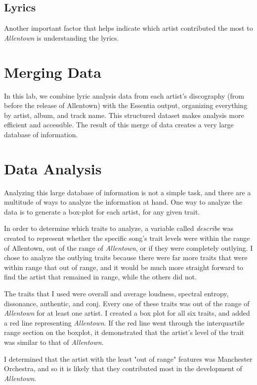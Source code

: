 \documentclass{article}\usepackage[]{graphicx}\usepackage[]{xcolor}
\begin{document}
\begin{multicols}{2}
\subsection{Lyrics}
Another important factor that helps indicate which artist contributed the most to  \emph{Allentown} is understanding the lyrics.

\section{Merging Data}
In this lab, we combine lyric analysis data from each artist’s discography (from before the release of Allentown) with the Essentia output, organizing everything by artist, album, and track name. This structured dataset makes analysis more efficient and accessible. The result of this merge of data creates a very large database of information.

\section{Data Analysis}
Analyzing this large database of information is not a simple task, and there are a multitude of ways to analyze the information at hand. One way to analyze the data is to generate a box-plot for each artist, for any given trait.

In order to determine which traits to analyze, a variable called \emph{describe} was created to represent whether the specific song's trait levels were within the range of Allentown, out of the range of \emph{Allentown}, or if they were completely outlying. I chose to analyze the outlying traits because there were far more traits that were within range that out of range, and it would be much more straight forward to find the artist that remained in range, while the others did not.

The traits that I used were overall and average loudness, spectral entropy, dissonance, authentic, and conj. Every one of these traits was out of the range of \emph{Allentown} for at least one artist. I created a box plot for all six traits, and added a red line representing \emph{Allentown}. If the red line went through the interquartile range section on the boxplot, it demonstrated that the artist's level of the trait was similar to that of \emph{Allentown}.

I determined that the artist with the least "out of range" features was Manchester Orchestra, and so it is likely that they contributed most in the development of \emph{Allentown}. 


\end{multicols}
\end{document}
